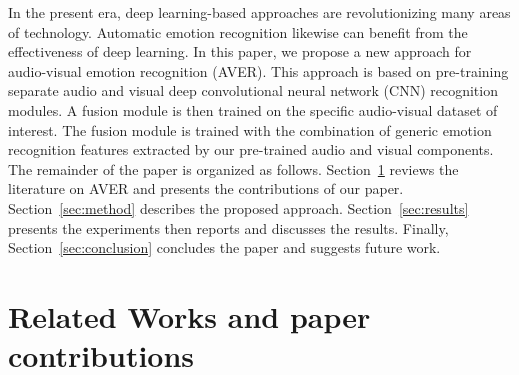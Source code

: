 \documentclass[times,twocolumn,final,authoryear]{elsarticle}
\begin{document}
	In the present era, deep learning-based approaches are revolutionizing many areas of technology. Automatic emotion recognition likewise can benefit from the effectiveness of deep learning. In this paper, we propose a new approach for audio-visual emotion recognition (AVER). This approach is based on pre-training separate audio and visual deep convolutional neural network (CNN) recognition modules. A fusion module is then trained on the specific audio-visual dataset of interest. The fusion module is trained with the combination of generic emotion recognition features extracted by our pre-trained audio and visual components. The remainder of the paper is organized as follows. Section~\ref{sec:related_work} reviews the literature on AVER and presents the contributions of our paper. Section~\ref{sec:method} describes the proposed approach. Section~\ref{sec:results} presents the experiments then reports and discusses the results. Finally, Section~\ref{sec:conclusion} concludes the paper and suggests future work.
	
	\section{Related Works and paper contributions}
	\label{sec:related_work}
	
\end{document}

